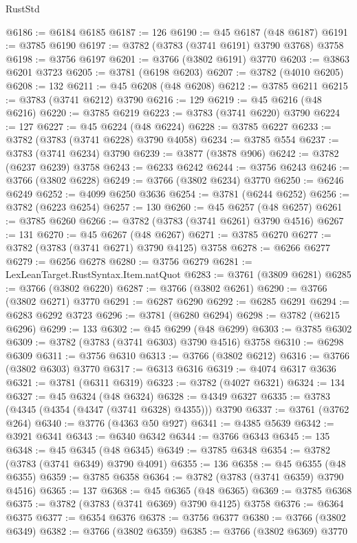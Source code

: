 \begin{lexlean}{RustStd}
\begin{coremodule}
@6186 := @6184 @6185
@6187 := 126
@6190 := @45 @6187 (@48 @6187)
@6191 := @3785 @6190
@6197 := @3782 (@3783 (@3741 @6191) @3790 @3768) @3758
@6198 := @3756 @6197
@6201 := @3766 (@3802 @6191) @3770
@6203 := @3863 @6201 @3723
@6205 := @3781 (@6198 @6203)
@6207 := @3782 (@4010 @6205)
@6208 := 132
@6211 := @45 @6208 (@48 @6208)
@6212 := @3785 @6211
@6215 := @3783 (@3741 @6212) @3790
@6216 := 129
@6219 := @45 @6216 (@48 @6216)
@6220 := @3785 @6219
@6223 := @3783 (@3741 @6220) @3790
@6224 := 127
@6227 := @45 @6224 (@48 @6224)
@6228 := @3785 @6227
@6233 := @3782 (@3783 (@3741 @6228) @3790 @4058)
@6234 := @3785 @554
@6237 := @3783 (@3741 @6234) @3790
@6239 := @3877 (@3878 @906)
@6242 := @3782 (@6237 @6239) @3758
@6243 := @6233 @6242
@6244 := @3756 @6243
@6246 := @3766 (@3802 @6228)
@6249 := @3766 (@3802 @6234) @3770
@6250 := @6246 @6249
@6252 := @4099 @6250 @3636
@6254 := @3781 (@6244 @6252)
@6256 := @3782 (@6223 @6254)
@6257 := 130
@6260 := @45 @6257 (@48 @6257)
@6261 := @3785 @6260
@6266 := @3782 (@3783 (@3741 @6261) @3790 @4516)
@6267 := 131
@6270 := @45 @6267 (@48 @6267)
@6271 := @3785 @6270
@6277 := @3782 (@3783 (@3741 @6271) @3790 @4125) @3758
@6278 := @6266 @6277
@6279 := @6256 @6278
@6280 := @3756 @6279
@6281 := LexLeanTarget.RustSyntax.Item.natQuot
@6283 := @3761 (@3809 @6281)
@6285 := @3766 (@3802 @6220)
@6287 := @3766 (@3802 @6261)
@6290 := @3766 (@3802 @6271) @3770
@6291 := @6287 @6290
@6292 := @6285 @6291
@6294 := @6283 @6292 @3723
@6296 := @3781 (@6280 @6294)
@6298 := @3782 (@6215 @6296)
@6299 := 133
@6302 := @45 @6299 (@48 @6299)
@6303 := @3785 @6302
@6309 := @3782 (@3783 (@3741 @6303) @3790 @4516) @3758
@6310 := @6298 @6309
@6311 := @3756 @6310
@6313 := @3766 (@3802 @6212)
@6316 := @3766 (@3802 @6303) @3770
@6317 := @6313 @6316
@6319 := @4074 @6317 @3636
@6321 := @3781 (@6311 @6319)
@6323 := @3782 (@4027 @6321)
@6324 := 134
@6327 := @45 @6324 (@48 @6324)
@6328 := @4349 @6327
@6335 := @3783 (@4345 (@4354 (@4347 (@3741 @6328) @4355))) @3790
@6337 := @3761 (@3762 @264)
@6340 := @3776 (@4363 @50 @927)
@6341 := @4385 @5639
@6342 := @3921 @6341
@6343 := @6340 @6342
@6344 := @3766 @6343
@6345 := 135
@6348 := @45 @6345 (@48 @6345)
@6349 := @3785 @6348
@6354 := @3782 (@3783 (@3741 @6349) @3790 @4091)
@6355 := 136
@6358 := @45 @6355 (@48 @6355)
@6359 := @3785 @6358
@6364 := @3782 (@3783 (@3741 @6359) @3790 @4516)
@6365 := 137
@6368 := @45 @6365 (@48 @6365)
@6369 := @3785 @6368
@6375 := @3782 (@3783 (@3741 @6369) @3790 @4125) @3758
@6376 := @6364 @6375
@6377 := @6354 @6376
@6378 := @3756 @6377
@6380 := @3766 (@3802 @6349)
@6382 := @3766 (@3802 @6359)
@6385 := @3766 (@3802 @6369) @3770

\end{coremodule}
\end{lexlean}
